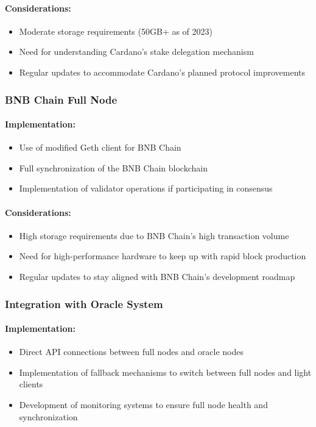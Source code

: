 \documentclass[12pt,a4paper]{article}
\begin{document}
	\paragraph{Considerations:}
	\begin{itemize}
		\item Moderate storage requirements (50GB+ as of 2023)
		\item Need for understanding Cardano's stake delegation mechanism
		\item Regular updates to accommodate Cardano's planned protocol improvements
	\end{itemize}
	
	\subsubsection{BNB Chain Full Node}
	\paragraph{Implementation:}
	\begin{itemize}
		\item Use of modified Geth client for BNB Chain
		\item Full synchronization of the BNB Chain blockchain
		\item Implementation of validator operations if participating in consensus
	\end{itemize}
	
	\paragraph{Considerations:}
	\begin{itemize}
		\item High storage requirements due to BNB Chain's high transaction volume
		\item Need for high-performance hardware to keep up with rapid block production
		\item Regular updates to stay aligned with BNB Chain's development roadmap
	\end{itemize}
	
	\subsubsection{Integration with Oracle System}
	\paragraph{Implementation:}
	\begin{itemize}
		\item Direct API connections between full nodes and oracle nodes
		\item Implementation of fallback mechanisms to switch between full nodes and light clients
		\item Development of monitoring systems to ensure full node health and synchronization
	\end{itemize}
	
\end{document}
